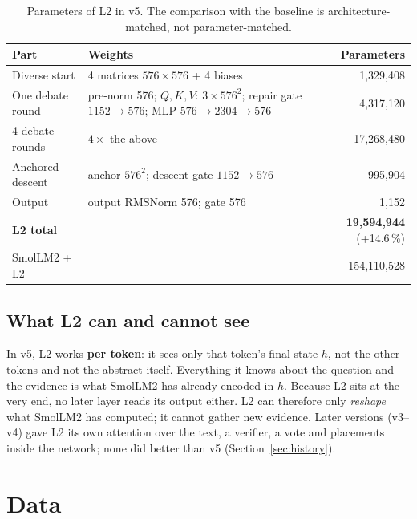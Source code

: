 \documentclass[a4paper,11pt,parskip=half]{scrartcl}
\begin{document}
\begin{table}[H]
\centering\small
\begin{tabularx}{\linewidth}{@{}lYr@{}}
\toprule
Part & Weights & Parameters\\
\midrule
Diverse start & 4 matrices $576\times576$ + 4 biases & 1{,}329{,}408\\
One debate round & pre-norm 576; $Q,K,V$: $3\times576^2$; repair gate $1152\rightarrow576$; MLP $576\rightarrow2304\rightarrow576$ & 4{,}317{,}120\\
4 debate rounds & $4\times$ the above & 17{,}268{,}480\\
Anchored descent & anchor $576^2$; descent gate $1152\rightarrow576$ & 995{,}904\\
Output & output RMSNorm 576; gate 576 & 1{,}152\\
\midrule
\textbf{L2 total} & & \textbf{19{,}594{,}944} (+14.6\,\%)\\
SmolLM2 + L2 & & 154{,}110{,}528\\
\bottomrule
\end{tabularx}
\caption{Parameters of L2 in v5. The comparison with the baseline is architecture-matched, not parameter-matched.}
\end{table}

\subsection{What L2 can and cannot see}

\begin{keybox}[title={An important property of the final design}]
In v5, L2 works \textbf{per token}: it sees only that token's final state $h$, not the other tokens and not the abstract itself. Everything it knows about the question and the evidence is what SmolLM2 has already encoded in $h$. Because L2 sits at the very end, no later layer reads its output either. L2 can therefore only \emph{reshape} what SmolLM2 has computed; it cannot gather new evidence. Later versions (v3--v4) gave L2 its own attention over the text, a verifier, a vote and placements inside the network; none did better than v5 (Section~\ref{sec:history}).
\end{keybox}

\section{Data}
\label{sec:data}
\end{document}
